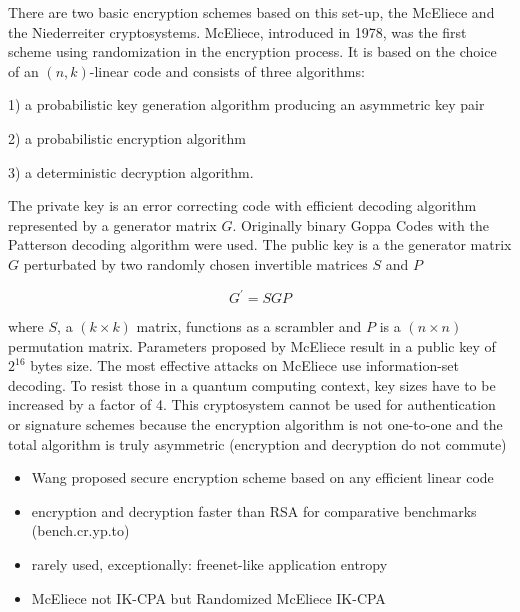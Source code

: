 \documentclass[a4paper,11pt]{article}
\newenvironment{my_enumerate}{
\begin{enumerate}
  \setlength{\itemsep}{0.2pt}
  \setlength{\parskip}{0pt}
  \setlength{\parsep}{0pt}}{\end{enumerate}
}
\begin{document}
\begin{multicols}{2}
There are two basic encryption schemes based on this set-up, the McEliece and the Niederreiter cryptosystems. McEliece, introduced in 1978, was the first scheme using randomization in the encryption process. It is based on the choice of an $(n,k)$-linear code and consists of three algorithms:

\begin{my_enumerate} 
\item[1)] a probabilistic key generation algorithm producing an asymmetric key pair
\item[2)] a probabilistic encryption algorithm
\item[3)] a deterministic decryption algorithm.
\end{my_enumerate}  

The private key is an error correcting code with efficient decoding algorithm represented by a generator matrix $G$. Originally binary Goppa Codes with the Patterson decoding algorithm were used. The public key is a the generator matrix $G$ perturbated by two randomly chosen invertible matrices $S$ and $P$

$$ G^\prime = SGP $$

where $S$, a $(k \times k)$ matrix, functions as a scrambler and $P$ is a $(n \times n)$ permutation matrix. Parameters proposed by McEliece result in a public key of $2^{16}$ bytes size. The most effective attacks on McEliece use information-set decoding. To resist those in a quantum computing context, key sizes have to be increased by a factor of 4. This cryptosystem cannot be used for authentication or signature schemes because the encryption algorithm is not one-to-one and the total algorithm is truly asymmetric (encryption and decryption do not commute)\\

\begin{itemize} [noitemsep, nolistsep]
\item Wang proposed secure encryption scheme based on any efficient linear code 
\item encryption and decryption faster than RSA for comparative benchmarks (bench.cr.yp.to) 
\item rarely used, exceptionally: freenet-like application entropy 
\item McEliece not IK-CPA but Randomized McEliece IK-CPA
\end{itemize} 



\end{multicols}
\end{document}
